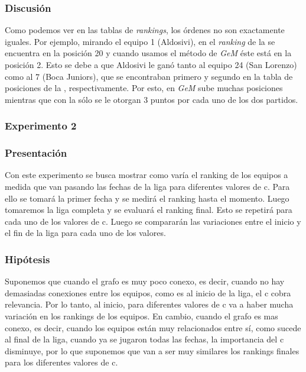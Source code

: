             \subsubsection*{Discusión}

            Como podemos ver en las tablas de \emph{rankings}, los órdenes no son exactamente iguales. Por ejemplo, mirando el equipo 1 (Aldosivi), en el \emph{ranking} de la  se encuentra en la posición 20 y cuando usamos el método de \emph{GeM} éste está en la posición 2. Esto se debe a que Aldosivi le ganó tanto al equipo 24 (San Lorenzo) como al 7 (Boca Juniors), que se encontraban primero y segundo en la tabla de posiciones de la , respectivamente. Por esto, en \emph{GeM} sube muchas posiciones mientras que con la  sólo se le otorgan 3 puntos por cada uno de los dos partidos.

        \subsubsection{Experimento 2}
            \subsubsection*{Presentación}
            Con este experimento se busca mostrar como varía el ranking de los equipos a medida que van pasando las fechas de la liga para diferentes valores de c. Para ello se tomará la primer fecha y se medirá el ranking hasta el momento. Luego tomaremos la liga completa y se evaluará el ranking final. Esto se repetirá para cada uno de los valores de c. Luego se compararán las variaciones entre el inicio y el fin de la liga para cada uno de los valores.

            \subsubsection*{Hipótesis}
            Suponemos que cuando el grafo es muy poco conexo, es decir, cuando no hay demasiadas conexiones entre los equipos, como es al inicio de la liga, el c cobra relevancia. Por lo tanto, al inicio, para diferentes valores de c va a haber mucha variación en los rankings de los equipos. En cambio, cuando el grafo es mas conexo, es decir, cuando los equipos están muy relacionados entre sí, como sucede al final de la liga, cuando ya se jugaron todas las fechas, la importancia del c disminuye, por lo que suponemos que van a ser muy similares los rankings finales para los diferentes valores de c.

